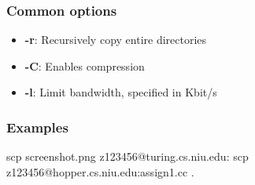 \documentclass{report}
\begin{document}
    \bigbreak \noindent 
    \subsubsection{Common options}
    \begin{itemize}
        \item \textbf{-r}: Recursively copy entire directories
        \item \textbf{-C}: Enables compression
        \item \textbf{-l}: Limit bandwidth, specified in Kbit/s
    \end{itemize}

    \bigbreak \noindent 
    \subsubsection{Examples}
    \bigbreak \noindent 
    \begin{bashcode}
    scp screenshot.png z123456@turing.cs.niu.edu:
    scp z123456@hopper.cs.niu.edu:assign1.cc .
    \end{bashcode}



    
\end{document}
